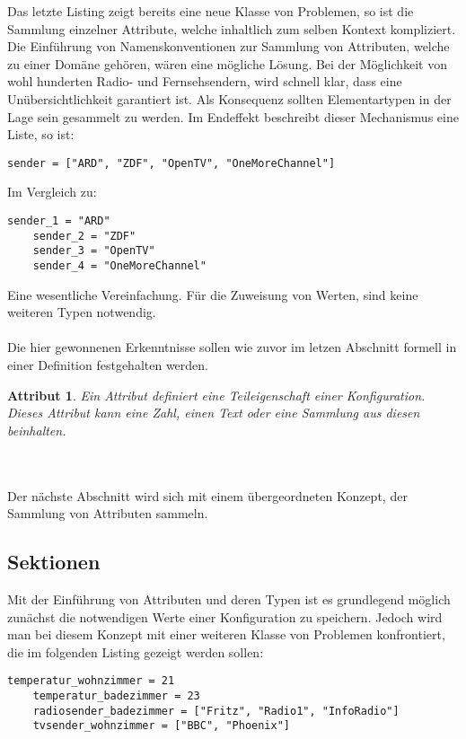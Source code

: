 Das letzte Listing zeigt bereits eine neue Klasse von Problemen, so ist die Sammlung einzelner Attribute, welche inhaltlich zum selben Kontext kompliziert. Die Einführung von Namenskonventionen zur Sammlung von Attributen, welche zu einer Domäne gehören, wären eine mögliche Lösung. Bei der Möglichkeit von wohl hunderten Radio- und Fernsehsendern, wird schnell klar, dass eine Unübersichtlichkeit garantiert ist. 	Als Konsequenz sollten Elementartypen in der Lage sein gesammelt zu werden. Im Endeffekt beschreibt dieser Mechanismus eine Liste, so ist:

\lstset{language=bash}
\begin{lstlisting}[caption=Sammlung mehrerer Attribute in einer Liste, captionpos=b]
   sender = ["ARD", "ZDF", "OpenTV", "OneMoreChannel"]
\end{lstlisting}

Im Vergleich zu: 

\lstset{language=bash}
\begin{lstlisting}[caption=Sammlung mehrerer Werte ohne Liste, captionpos=b]
  sender_1 = "ARD"
	sender_2 = "ZDF"
	sender_3 = "OpenTV"
	sender_4 = "OneMoreChannel"
\end{lstlisting}


Eine wesentliche Vereinfachung. Für die Zuweisung von Werten, sind keine weiteren Typen notwendig. 
\\\\
Die hier gewonnenen Erkenntnisse sollen wie zuvor im letzen Abschnitt formell in einer Definition festgehalten werden.

\newtheorem{mydef}{Attribut}
\begin{mydef}
Ein Attribut definiert eine Teileigenschaft einer Konfiguration. Dieses Attribut kann eine Zahl, einen Text oder eine Sammlung aus diesen beinhalten.
\end{mydef}
\\\\
Der nächste Abschnitt wird sich mit einem übergeordneten Konzept, der Sammlung von Attributen sammeln.


\subsection{Sektionen}
Mit der Einführung von Attributen und deren Typen ist es grundlegend möglich zunächst die notwendigen Werte einer Konfiguration zu speichern. Jedoch wird man bei diesem Konzept mit einer weiteren Klasse von Problemen konfrontiert, die im folgenden Listing gezeigt werden sollen:
\lstset{language=bash}
\begin{lstlisting}[caption=Attributssammlung ohne Sektionen, captionpos=b]
  temperatur_wohnzimmer = 21
	temperatur_badezimmer = 23
	radiosender_badezimmer = ["Fritz", "Radio1", "InfoRadio"]
	tvsender_wohnzimmer = ["BBC", "Phoenix"]
\end{lstlisting}

